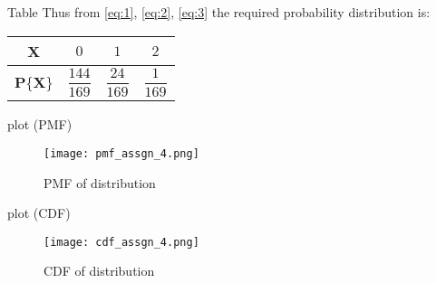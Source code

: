 \documentclass{beamer}
\begin{document}
\begin{frame}{Table}
Thus from \eqref{eq:1}, \eqref{eq:2}, \eqref{eq:3} the required probability distribution is:\\
\begin{center}
\begin{tabular}{ |c|c|c|c| } 
 \hline
 \textbf{X} & $0$ & $1$ & $2$\\ 
 \hline
 \textbf{P}\{\textbf{X}\} & $\dfrac{144}{169}$ & $\dfrac{24}{169}$ & $\dfrac{1}{169}$  \\ 
 \hline
\end{tabular}
\end{center}
\end{frame}
    
\begin{frame}{plot (PMF)}
 \begin{figure}
 \vspace{-5mm}
 \texttt{[image: pmf\_assgn\_4.png]}
\caption{PMF of distribution}
\label{fig-1}
\end{figure}   
\end{frame}

\begin{frame}{plot (CDF)}
 \begin{figure}
 \vspace{-5mm}
 \texttt{[image: cdf\_assgn\_4.png]}
\caption{CDF of distribution}
\label{fig-2}
\end{figure}   
\end{frame}
\end{document}

